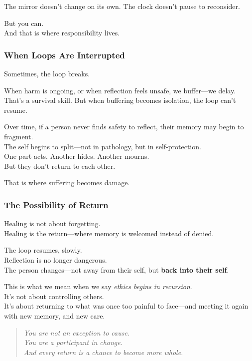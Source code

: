The mirror doesn't change on its own. The clock doesn't pause to
reconsider.

But you can.\\
And that is where responsibility lives.

\subsubsection{\texorpdfstring{\textbf{When Loops Are
Interrupted}}{When Loops Are Interrupted}}\label{when-loops-are-interrupted}

Sometimes, the loop breaks.

When harm is ongoing, or when reflection feels unsafe, we buffer---we
delay.\\
That's a survival skill. But when buffering becomes isolation, the loop
can't resume.

Over time, if a person never finds safety to reflect, their memory may
begin to fragment.\\
The self begins to split---not in pathology, but in self-protection.\\
One part acts. Another hides. Another mourns.\\
But they don't return to each other.

That is where suffering becomes damage.

\subsubsection{\texorpdfstring{\textbf{The Possibility of
Return}}{The Possibility of Return}}\label{the-possibility-of-return}

Healing is not about forgetting.\\
Healing is the return---where memory is welcomed instead of denied.

The loop resumes, slowly.\\
Reflection is no longer dangerous.\\
The person changes---not away from their self, but \textbf{back into
their self}.

This is what we mean when we say \emph{ethics begins in recursion}.\\
It's not about controlling others.\\
It's about returning to what was once too painful to face---and meeting
it again with new memory, and new care.

\begin{quote}
\emph{You are not an exception to cause.\\
You are a participant in change.\\
And every return is a chance to become more whole.}
\end{quote}


